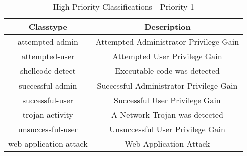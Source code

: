 \documentclass[english]{report}
\begin{document}
%
\begin{table}[!hbpt]

\caption{High Priority Classifications - Priority 1\label{Snort Default Classifications}}

\begin{center}\begin{tabular}{|c|c|}
\hline 
Classtype&
Description\\
\hline
\hline 
attempted-admin&
Attempted Administrator Privilege Gain\\
\hline 
attempted-user&
Attempted User Privilege Gain\\
\hline 
shellcode-detect&
Executable code was detected\\
\hline 
successful-admin&
Successful Administrator Privilege Gain\\
\hline 
successful-user&
Successful User Privilege Gain\\
\hline 
trojan-activity&
A Network Trojan was detected\\
\hline 
unsuccessful-user&
Unsuccessful User Privilege Gain\\
\hline 
web-application-attack&
Web Application Attack\\
\hline
\end{tabular}\end{center}
\end{table}
\end{document}
